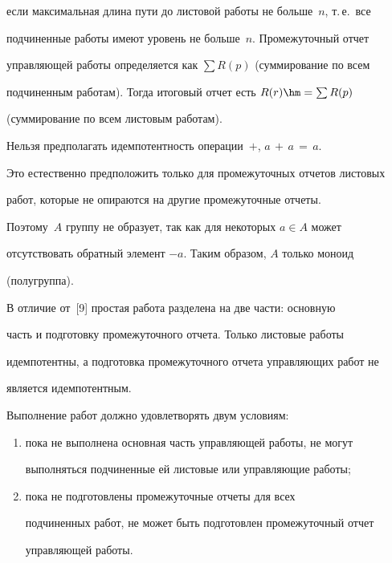 если максимальная длина пути до листовой работы не больше~$n$, т.\,е.\ все 


подчиненные работы имеют уровень не больше~$n$. Промежуточный отчет 


управляющей работы определяется как $\sum R(p)$ (суммирование по всем 


подчиненным работам). Тогда итоговый отчет есть $R(r)\hm=\sum R(p)$ 


(суммирование по всем листовым работам).


      


      Нельзя предполагать идемпотентность операции~$+$, $a\,+\,a\,=\,a$. 


Это естественно предположить только для промежуточных отчетов листовых 


работ, которые не опираются на другие промежуточные отчеты. 


Поэтому~$A$ группу не образует, так как для некоторых $a\in A$ может 


отсутствовать обратный элемент $-a$. Таким образом, $A$ только моноид 


(полугруппа).


      


      В отличие от~[9] простая работа разделена на две части: основную 


часть и  подготовку промежуточного отчета.  Только листовые работы 


идемпотентны, а подготовка промежуточного отчета управляющих работ не 


является идемпотентным. 


      


      Выполнение работ должно удовлетворять двум условиям: 


\begin{enumerate}[(1)]


\item пока не выполнена основная часть управляющей работы, не могут 


выполняться подчиненные ей листовые или управляющие работы;


\item пока не подготовлены промежуточные отчеты для всех 


подчиненных работ, не может быть подготовлен промежуточный отчет 


управляющей работы.


\end{enumerate}






